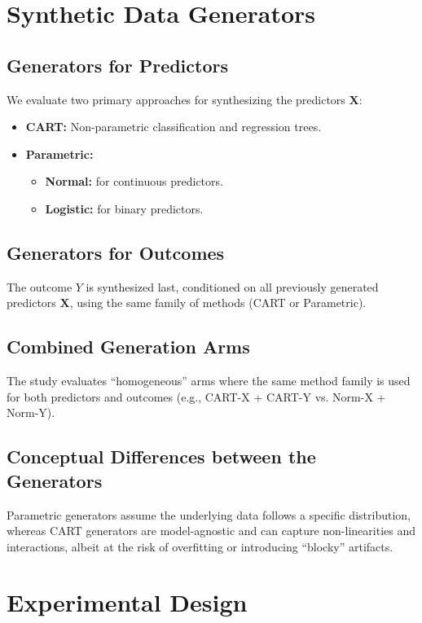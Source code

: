 \section{Synthetic Data Generators}
\label{sec:reg-generators}

\subsection{Generators for Predictors}
We evaluate two primary approaches for synthesizing the predictors $\mathbf{X}$:
\begin{itemize}
    \item \textbf{CART:} Non-parametric classification and regression trees.
    \item \textbf{Parametric:}
    \begin{itemize}
        \item \textbf{Normal:} for continuous predictors.
        \item \textbf{Logistic:} for binary predictors.
    \end{itemize}
\end{itemize}

\subsection{Generators for Outcomes}
The outcome $Y$ is synthesized last, conditioned on all previously generated predictors $\mathbf{X}$, using the same family of methods (CART or Parametric).

\subsection{Combined Generation Arms}
The study evaluates ``homogeneous'' arms where the same method family is used for both predictors and outcomes (e.g., CART-X + CART-Y vs. Norm-X + Norm-Y).

\subsection{Conceptual Differences between the Generators}
Parametric generators assume the underlying data follows a specific distribution, whereas CART generators are model-agnostic and can capture non-linearities and interactions, albeit at the risk of overfitting or introducing ``blocky'' artifacts.

\section{Experimental Design}
\label{sec:reg-experimental-design}

